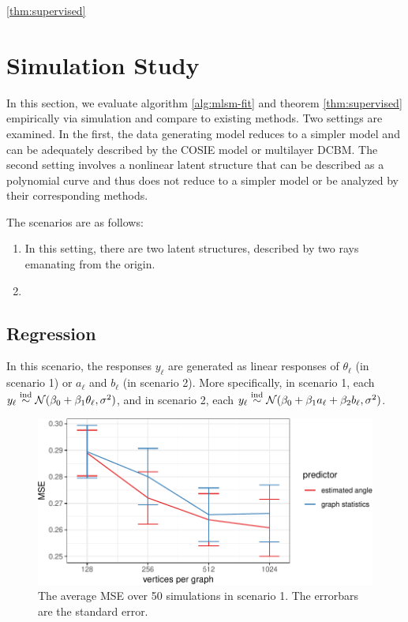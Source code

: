 \documentclass[12pt]{article}
\begin{document}
\begin{theorem}
\ref{thm:supervised}
\end{theorem}

\section{Simulation Study}\label{simulation-study}

In this section, we evaluate algorithm \ref{alg:mlsm-fit} and theorem
\ref{thm:supervised} empirically via simulation and compare to existing
methods. Two settings are examined. In the first, the data generating
model reduces to a simpler model and can be adequately described by the
COSIE model or multilayer DCBM. The second setting involves a nonlinear
latent structure that can be described as a polynomial curve and thus
does not reduce to a simpler model or be analyzed by their corresponding
methods.

The scenarios are as follows:

\begin{enumerate}
\def\labelenumi{\arabic{enumi}.}
\item
  In this setting, there are two latent structures, described by two
  rays emanating from the origin.
\item
\end{enumerate}

\subsection{Regression}\label{regression}

In this scenario, the responses \(y_\ell\) are generated as linear
responses of \(\theta_\ell\) (in scenario 1) or \(a_\ell\) and
\(b_\ell\) (in scenario 2). More specifically, in scenario 1, each
\(y_\ell \stackrel{\mathrm{ind}}{\sim} \mathcal{N}(\beta_0 + \beta_1 \theta_\ell, \sigma^2)\),
and in scenario 2, each
\(y_\ell \stackrel{\mathrm{ind}}{\sim} \mathcal{N}(\beta_0 + \beta_1 a_\ell + \beta_2 b_\ell, \sigma^2)\).

\begin{figure}[H]

{\centering \includegraphics{draft_files/figure-latex/angle-regression-sim-1} 

}

\caption{The average MSE over 50 simulations in scenario 1. The errorbars are the standard error.}\label{fig:angle-regression-sim}
\end{figure}
\end{document}
